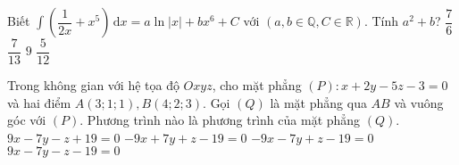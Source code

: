 \begin{ex}%
	Biết $\displaystyle\int \left(\dfrac{1}{2x}+x^5\right)\mathrm{\,d}x=a\ln \left|x\right|+bx^6+C$ với $\left(a,b\in \mathbb{Q},C\in \mathbb{R}\right)$. Tính $a^2+b$?
	\choice
	{$\dfrac{7}{6}$}
	{$\dfrac{7}{13}$}
	{$9$}
	{\True $\dfrac{5}{12}$}
\end{ex}
\begin{ex}%
	Trong không gian với hệ tọa độ $Oxyz$, cho mặt phẳng $(P)\colon x+2y-5z-3=0$ và hai điểm $A(3;1;1),B(4;2;3)$. Gọi $(Q)$ là mặt phẳng qua $AB$ và vuông góc với $(P)$. Phương trình nào là phương trình của mặt phẳng $(Q)$.
	\choice
	{$9x-7y-z+19=0$}
	{$-9x+7y+z-19=0$}
	{$-9x-7y+z-19=0$}
	{\True $9x-7y-z-19=0$}
\end{ex}
